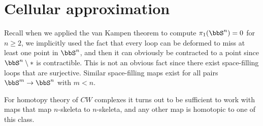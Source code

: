 \section{Cellular approximation}


Recall when we applied the van Kampen theorem to compute $\pi_1(\bbS^n)=0$ for $n\geq 2$, we implicitly used the fact that every loop can be deformed to miss at least one point in $\bbS^n$, and then it can obviously be contracted to a point since $\bbS^n\setminus *$ is contractible. This is not an obvious fact since there exist space-filling loops that are surjective. Similar space-filling maps exist for all pairs $\bbS^m\to \bbS^n$ with $m<n$.

For homotopy theory of $CW$ complexes it turns out to be sufficient to work with maps that map $n$-skeleta to $n$-skeleta, and any other map is homotopic to one of this class.




